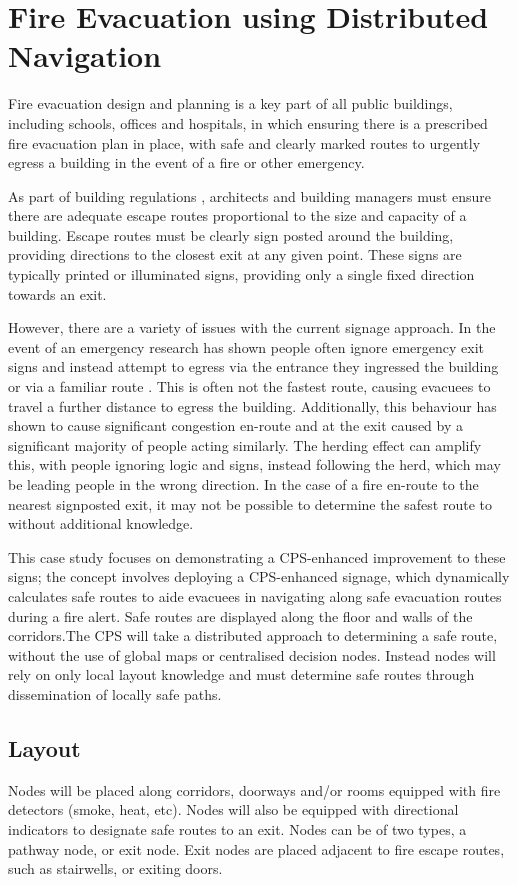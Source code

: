 \section{Fire Evacuation using Distributed Navigation}
Fire evacuation design and planning is a key part of all public buildings, including schools, offices and hospitals, in which ensuring there is a prescribed fire evacuation plan in place, with safe and clearly marked routes to urgently egress a building in the event of a fire or other emergency. 

As part of building regulations \cite{fireLegislation}, architects and building managers must ensure there are adequate escape routes proportional to the size and capacity of a building. Escape routes must be clearly sign posted around the building, providing directions to the closest exit at any given point. These signs are typically printed or illuminated signs, providing only a single fixed direction towards an exit.

However, there are a variety of issues with the current signage approach. In the event of an emergency research has shown people often ignore emergency exit signs and instead attempt to egress via the entrance they ingressed the building or via a familiar route \cite{Sime1983}. This is often not the fastest route, causing evacuees to travel a further distance to egress the building. Additionally, this behaviour has shown to cause significant congestion en-route and at the exit caused by a significant majority of people acting similarly. The herding effect can amplify this, with people ignoring logic and signs, instead following the herd\cite{Sime1983,Helbing}, which may be leading people in the wrong direction. In the case of a fire en-route to the nearest signposted exit, it may not be possible to determine the safest route to without additional knowledge.

This case study focuses on demonstrating a CPS-enhanced improvement to these signs; the concept involves deploying a CPS-enhanced signage, which dynamically calculates safe routes to aide evacuees in navigating along safe evacuation routes during a fire alert. Safe routes are displayed along the floor and walls of the corridors.The CPS will take a distributed approach to determining a safe route, without the use of global maps or centralised decision nodes. Instead nodes will rely on only local layout knowledge and must determine safe routes through dissemination of locally safe paths.


\subsection{Layout}
\label{subsec:evac_cps_layout}
Nodes will be placed along corridors, doorways and/or rooms equipped with fire detectors (smoke, heat, etc). Nodes will also be equipped with directional indicators to designate safe routes to an exit. Nodes can be of two types, a pathway node, or exit node. Exit nodes are placed adjacent to fire escape routes, such as stairwells, or exiting doors.

